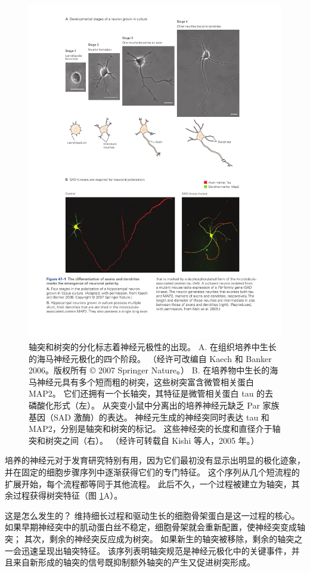 \begin{figure}[htbp]
	\centering
	\includegraphics[width=0.75\linewidth]{chap47/fig_47_1}
	\caption{轴突和树突的分化标志着神经元极性的出现。 A. 在组织培养中生长的海马神经元极化的四个阶段。 （经许可改编自 Kaech 和 Banker 2006。版权所有 © 2007 Springer Nature。） B. 在培养物中生长的海马神经元具有多个短而粗的树突，这些树突富含微管相关蛋白 MAP2。 它们还拥有一个长轴突，其特征是微管相关蛋白 tau 的去磷酸化形式（左）。 从突变小鼠中分离出的培养神经元缺乏 Par 家族基因（SAD 激酶）的表达。 神经元生成的神经突同时表达 tau 和 MAP2，分别是轴突和树突的标记。 这些神经突的长度和直径介于轴突和树突之间（右）。 （经许可转载自 Kishi 等人，2005 年。）}
	\label{fig:47_1}
\end{figure}


培养的神经元对于发育研究特别有用，因为它们最初没有显示出明显的极化迹象，并在固定的细胞步骤序列中逐渐获得它们的专门特征。
这个序列从几个短流程的扩展开始，每个流程都等同于其他流程。
此后不久，一个过程被建立为轴突，其余过程获得树突特征（图 \ref{fig:47_1}A）。


这是怎么发生的？
维持细长过程和驱动生长的细胞骨架蛋白是这一过程的核心。
如果早期神经突中的肌动蛋白丝不稳定，细胞骨架就会重新配置，使神经突变成轴突；
其次，剩余的神经突反应成为树突。
如果新生的轴突被移除，剩余的轴突之一会迅速呈现出轴突特征。
该序列表明轴突规范是神经元极化中的关键事件，并且来自新形成的轴突的信号既抑制额外轴突的产生又促进树突形成。


